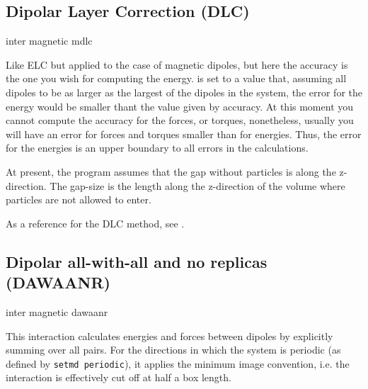 \subsection{Dipolar Layer Correction (DLC)}

\begin{essyntax}
  inter magnetic mdlc  
  \begin{features}
  \end{features}
\end{essyntax}

Like ELC but applied to the case of magnetic dipoles, but here the
accuracy is the one you wish for computing the energy.
 is set to a value that, assuming all dipoles to be as
larger as the largest of the dipoles in the system, the error for the
energy would be smaller thant the value given by accuracy. At this
moment you cannot compute the accuracy for the forces, or torques,
nonetheless, usually you will have an error for forces and torques
smaller than for energies. Thus, the error for the energies is an
upper boundary to all errors in the calculations.

At present, the program assumes that the gap without particles is
along the z-direction.  The gap-size is the length along the
z-direction of the volume where particles are not allowed to enter.

As a reference for the DLC method, see \cite{brodka04a}.

\subsection{Dipolar all-with-all and no replicas (DAWAANR)}

\begin{essyntax}
  inter magnetic  dawaanr
  \begin{features}
  \end{features}
\end{essyntax}

This interaction calculates energies and forces between dipoles by
explicitly summing over all pairs.  For the directions in which the
system is periodic (as defined by \texttt{setmd periodic}), it applies
the minimum image convention, i.e. the interaction is effectively cut
off at half a box length.

